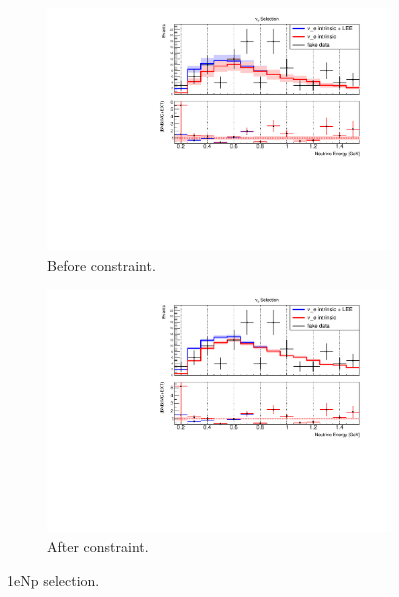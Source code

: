 \begin{figure}[H] 
\begin{center}
    \begin{subfigure}[b]{0.45\textwidth}
    \centering
    \includegraphics[width=1.00\textwidth]{Fakedata/set2/nue_numu_reco_e_H1_mc_fakedata_set2_nue_before_data_constraint.pdf}
    \caption{\label{fig:fakedata:set1:np_before_constrain} Before constraint.}
    \end{subfigure}
    \begin{subfigure}[b]{0.45\textwidth}
    \centering
    \includegraphics[width=1.00\textwidth]{Fakedata/set2/nue_numu_reco_e_H1_mc_fakedata_set2_univ_overlay_nue.pdf}
    \caption{\label{fig:fakedata:set2:np_after_constrain} After constraint.}
    \end{subfigure}
\caption{\label{fig:fakedata:set2:np_const} 1eNp selection.}
\end{center}
\end{figure}

